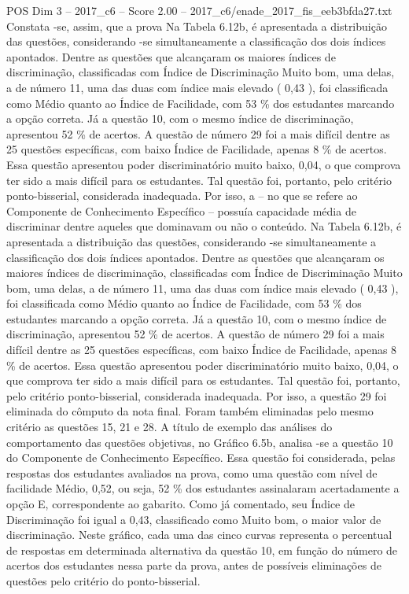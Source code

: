 \begin{textsample}{POS Dim 3 – 2017\_c6 – Score 2.00 – 2017\_c6/enade\_2017\_fis\_eeb3bfda27.txt}
Constata -se, assim, que a prova Na Tabela 6.12b, é apresentada a distribuição das questões, considerando -se simultaneamente a classificação dos dois índices apontados.
Dentre as questões que alcançaram os maiores índices de discriminação, classificadas com Índice de Discriminação Muito bom, uma delas, a de número 11, uma das duas com índice mais elevado ( 0,43 ), foi classificada como Médio quanto ao Índice de Facilidade, com 53 \% dos estudantes marcando a opção correta.
Já a questão 10, com o mesmo índice de discriminação, apresentou 52 \% de acertos.
A questão de número 29 foi a mais difícil dentre as 25 questões específicas, com baixo Índice de Facilidade, apenas 8 \% de acertos.
Essa questão apresentou poder discriminatório muito baixo, 0,04, o que comprova ter sido a mais difícil para os estudantes.
Tal questão foi, portanto, pelo critério ponto-bisserial, considerada inadequada.
Por isso, a – no que se refere ao Componente de Conhecimento Específico – possuía capacidade média de discriminar dentre aqueles que dominavam ou não o conteúdo.
Na Tabela 6.12b, é apresentada a distribuição das questões, considerando -se simultaneamente a classificação dos dois índices apontados.
Dentre as questões que alcançaram os maiores índices de discriminação, classificadas com Índice de Discriminação Muito bom, uma delas, a de número 11, uma das duas com índice mais elevado ( 0,43 ), foi classificada como Médio quanto ao Índice de Facilidade, com 53 \% dos estudantes marcando a opção correta.
Já a questão 10, com o mesmo índice de discriminação, apresentou 52 \% de acertos.
A questão de número 29 foi a mais difícil dentre as 25 questões específicas, com baixo Índice de Facilidade, apenas 8 \% de acertos.
Essa questão apresentou poder discriminatório muito baixo, 0,04, o que comprova ter sido a mais difícil para os estudantes.
Tal questão foi, portanto, pelo critério ponto-bisserial, considerada inadequada.
Por isso, a questão 29 foi eliminada do cômputo da nota final.
Foram também eliminadas pelo mesmo critério as questões 15, 21 e 28.
A título de exemplo das análises do comportamento das questões objetivas, no Gráfico 6.5b, analisa -se a questão 10 do Componente de Conhecimento Específico.
Essa questão foi considerada, pelas respostas dos estudantes avaliados na prova, como uma questão com nível de facilidade Médio, 0,52, ou seja, 52 \% dos estudantes assinalaram acertadamente a opção E, correspondente ao gabarito.
Como já comentado, seu Índice de Discriminação foi igual a 0,43, classificado como Muito bom, o maior valor de discriminação.
Neste gráfico, cada uma das cinco curvas representa o percentual de respostas em determinada alternativa da questão 10, em função do número de acertos dos estudantes nessa parte da prova, antes de possíveis eliminações de questões pelo critério do ponto-bisserial.

\end{textsample}
